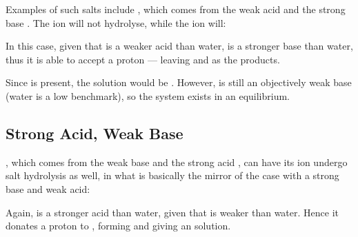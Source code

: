 			Examples of such salts include , which comes from the weak acid  and the strong base .
			The  ion will not hydrolyse, while the  ion will:


			In this case, given that  is a weaker acid than water,  is a stronger base than water, thus it is
			able to accept a proton --- leaving  and  as the products.

			Since  is present, the solution would be . However,  is still an objectively weak base
			(water is a low benchmark), so the system exists in an equilibrium.



		\subsection{Strong Acid, Weak Base}
			, which comes from the weak base  and the strong acid , can have its  ion undergo
			salt hydrolysis as well, in what is basically the mirror of the case with a strong base and weak acid:


			Again,  is a stronger acid than water, given that  is weaker than water. Hence it donates a proton to ,
			forming  and giving an  solution.

